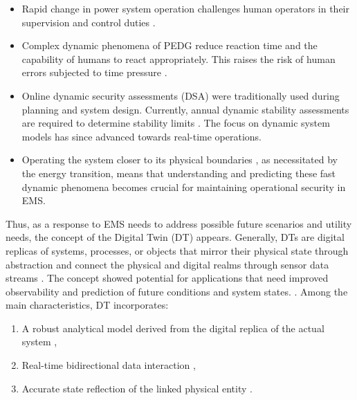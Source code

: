 
\begin{itemize}
    \item Rapid change in power system operation challenges human operators in their supervision and control duties \autocite{cigre_700}.
    
    \item Complex dynamic phenomena of PEDG reduce reaction time and the capability of humans to react appropriately. This raises the risk of human errors subjected to time pressure \autocite{HAASS20155285}.
    
    \item Online dynamic security assessments (DSA) were traditionally used during planning and system design. Currently, annual dynamic stability assessments are required to determine stability limits \autocite{european_union_2017_1485}. The focus on dynamic system models has since advanced towards real-time operations.

    \item  Operating the system closer to its physical boundaries \autocite{8295027}, as necessitated by the energy transition, means that understanding and predicting these fast dynamic phenomena becomes crucial for maintaining operational security in EMS.
    
\end{itemize}


Thus, as a response to EMS needs to address possible future scenarios and utility needs, the concept of the Digital Twin (DT) appears. Generally, DTs are digital replicas of systems, processes, or objects that mirror their physical state through abstraction and connect the physical and digital realms through sensor data streams \autocite{10311709}. The concept showed potential for applications that need improved observability and prediction of future conditions and system states. \autocite{eyre_untangling_2020}. Among the main characteristics, DT incorporates:
\begin{enumerate}
    \item A robust analytical model derived from the digital replica of the actual system \autocite{Trauer_2020},
    \item Real-time bidirectional data interaction \autocite{VANDERHORN2021113524},
    \item Accurate state reflection of the linked physical entity \autocite{JONES202036}.
\end{enumerate}

